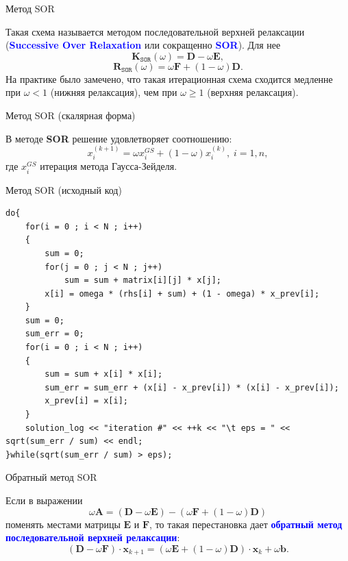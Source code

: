 \documentclass[10pt,xcolor=pst,aspectratio=169]{beamer}
\begin{document}
\begin{frame}{Метод SOR}

	\transdissolve[duration=0.2]
	\justifying
	\large
	Такая схема называется методом последовательной верхней релаксации (\textbf{\textcolor{blue}{Successive Over Relaxation}} или сокращенно \textbf{\textcolor{blue}{SOR}}). Для нее
	\[
		\textbf{K}_{\texttt{SOR}} (\omega) = \textbf{D} - \omega \textbf{E},
	\]
	\[
		\textbf{R}_{\texttt{SOR}} (\omega) = \omega \textbf{F} + (1 - \omega) \textbf{D}.
	\]
	На практике было замечено, что такая итерационная  схема сходится медленне при $\omega < 1$ (нижняя релаксация), чем при $\omega \geqslant 1$ (верхняя релаксация).

\end{frame}

\begin{frame}{Метод SOR (скалярная форма)}

	\transdissolve[duration=0.2]
	\justifying
	\large
	В методе \textbf{SOR} решение удовлетворяет соотношению:
	\[
		x_{i}^{(k+1)} = \omega x_{i}^{GS} + (1 - \omega) x_{i}^{(k)}, \; i = 1,n,
	\]
	где $x_{i}^{GS}$ итерация метода Гаусса-Зейделя.

\end{frame}

\begin{frame}[fragile]{Метод SOR (исходный код)}

	\transdissolve[duration=0.2]
	\begin{lstlisting}
do{
    for(i = 0 ; i < N ; i++)
    {
        sum = 0;
        for(j = 0 ; j < N ; j++)
            sum = sum + matrix[i][j] * x[j];
        x[i] = omega * (rhs[i] + sum) + (1 - omega) * x_prev[i];
    }
    sum = 0;
    sum_err = 0;
    for(i = 0 ; i < N ; i++)
    {
        sum = sum + x[i] * x[i];
        sum_err = sum_err + (x[i] - x_prev[i]) * (x[i] - x_prev[i]);
        x_prev[i] = x[i];
    }
    solution_log << "iteration #" << ++k << "\t eps = " << sqrt(sum_err / sum) << endl;
}while(sqrt(sum_err / sum) > eps);
	\end{lstlisting}

\end{frame}

\begin{frame}{Обратный метод SOR}

	\transdissolve[duration=0.2]
	\justifying
	\large
	Если в выражении
	\[
		\omega \textbf{A} = (\textbf{D} - \omega \textbf{E}) - (\omega \textbf{F} + (1 - \omega) \textbf{D})
	\]
	поменять местами матрицы $\textbf{E}$ и $\textbf{F}$, то такая перестановка дает \textbf{\textcolor{blue}{обратный метод последовательной верхней релаксации}}:
	\[
		(\textbf{D} - \omega \textbf{F}) \cdot \textbf{x}_{k+1} = (\omega \textbf{E} + (1 - \omega) \textbf{D}) \cdot \textbf{x}_{k} + \omega \textbf{b}.
	\]

\end{frame}
\end{document}
